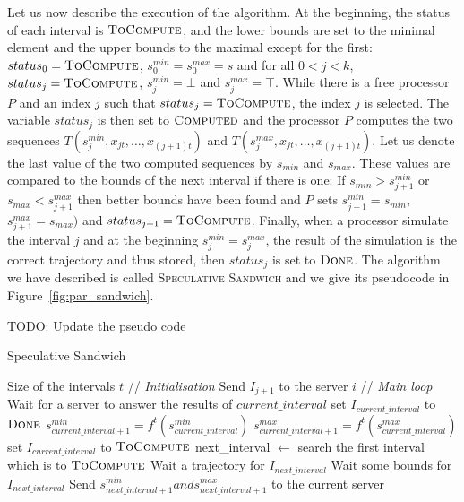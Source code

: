 \documentclass[a4paper,10pt]{article}
\newcommand{\todo}[1]{{\color{red} TODO: {#1}}}
\begin{document}
Let us now describe the execution of the algorithm. At the beginning, the status of each interval is $\textsc{ToCompute}$, and the lower bounds are set to the minimal element and the upper bounds to the maximal except for the first: 
$status_0 = \textsc{ToCompute}$, $s_0^{min} = s_0^{max} = s$ and for all $0 < j < k$, $status_j = \textsc{ToCompute}$,  $s_j^{min} = \bot$ and $s_j^{max} = \top$. 
While there is a free processor $P$ and an index $j$ such that $status_j = \textsc{ToCompute}$, the index $j$ is selected. The variable $status_j$ is then set to $\textsc{Computed}$ and the processor $P$ computes the two sequences $T(s_j^{min},x_{jt},\dots,x_{(j+1)t})$ and $T(s_j^{max},x_{jt},\dots,x_{(j+1)t})$. 
Let us denote the last value of the two computed sequences by $s_{min}$ and $s_{max}$. These values are compared to the bounds of the next interval if there is one: If $s_{min} > s_{j+1}^{min}$ or $ s_{max} < s_{j+1}^{max}$ then better bounds have been found and $P$ sets $s_{j+1}^{min} = s_{min}$, $s_{j+1}^{max} = s_{max})$ and $status_{j+1} = \textsc{ToCompute}$.
Finally, when a processor simulate the interval $j$ and at the beginning $s_j^{min} = s_j^{max}$, the result of the simulation is  the correct trajectory and thus stored, then $status_j$ is set to $\textsc{Done}$.
The algorithm we have described is called \textsc{Speculative Sandwich} and we give its pseudocode in Figure~\ref{fig:par_sandwich}.

\todo{Update the pseudo code}
 	\begin{algorithm}[H]
 	\caption{Speculative Sandwich}
 	\label{fig:par_sandwich}
 	\begin{algorithmic}
	\REQUIRE Size of the intervals $t$
 	\STATE // {\em Initialisation}
	\STATE Send $I_{j+1}$ to the server $i$
	\ENDFOR
	\STATE // {\em Main loop}
	\STATE Wait for a server to answer the results of $current\_interval$
	\STATE set $I_{current\_interval}$ to $\textsc{Done}$
	\ENDIF
	\STATE $s_{current\_interval+1}^{min} = f^t(s_{current\_interval}^{min})$
	\STATE $s_{current\_interval+1}^{max} = f^t(s_{current\_interval}^{max})$
	\STATE set $I_{current\_interval}$ to $\textsc{ToCompute}$
	\ENDIF
	\STATE next\_interval $\leftarrow$ search the first interval which is to  $\textsc{ToCompute}$
		\STATE Wait a trajectory for $I_{next\_interval}$
	\ELSE
		\STATE Wait some bounds for $I_{next\_interval}$
	\ENDIF	
		\STATE Send $s_{next\_interval+1}^{min} and s_{next\_interval+1}^{max}$ to the current server
	\ENDWHILE
 
 	\end{algorithmic}
 	\end{algorithm}
 
\end{document}
